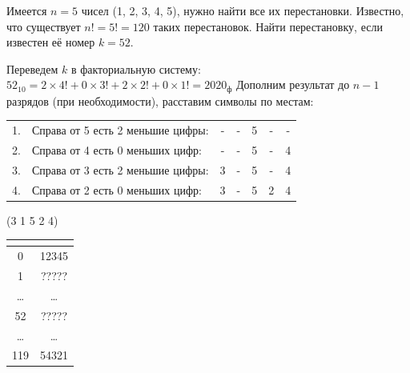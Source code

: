 \noindent
\begin{minipage}[t]{.75\linewidth}
    \flushleft%

    \begin{example}
        \task%
        Имеется $n = 5$ чисел (1, 2, 3, 4, 5), нужно найти все их перестановки. Известно, что существует $n! = 5! = 120$ таких перестановок. Найти перестановку, если известен её номер $k = 52$.

        \solution%
        Переведем $k$ в факториальную систему: $52_{10} = 2 \times 4! + 0 \times 3! + 2\times 2! + 0 \times 1! = 2020_{\text{ф}}$
        Дополним результат до $n - 1$ разрядов (при необходимости), расставим символы по местам:

        \begin{tabular}{rlccccc}
            1. & Справа от 5 есть 2 меньшие цифры: & - & - & 5 & - & - \\ %
            2. & Справа от 4 есть 0 меньших цифр:  & - & - & 5 & - & 4 \\ %
            3. & Справа от 3 есть 2 меньшие цифры: & 3 & - & 5 & - & 4 \\ %
            4. & Справа от 2 есть 0 меньших цифр:  & 3 & - & 5 & 2 & 4 \\ %
        \end{tabular}

        \answer%
        (3 1 5 2 4)
    \end{example}
\end{minipage}
\hfill
\noindent
\begin{minipage}[t]{.2\linewidth}
    \vspace{0pt}
    \flushright%
    \begin{tabular}{|c|c|}
        \multicolumn{2}{c}{} \\ %
        \hline
        0     & 12345 \\
        1     & ????? \\ %
        \dots & \dots \\
        52    & ????? \\ %
        \dots & \dots \\
        119   & 54321 \\
        \hline
    \end{tabular}
\end{minipage}

